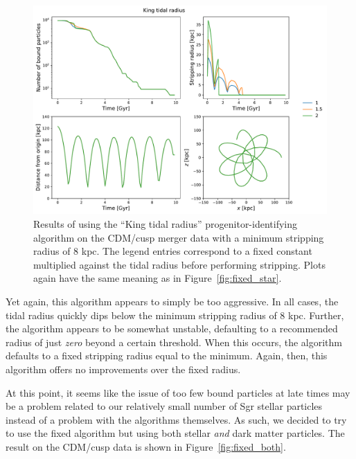 \begin{figure}
    \centering
    \includegraphics[width=0.9\linewidth]{figs/king_star.pdf}
    \caption{%
        Results of using the ``King tidal radius'' progenitor-identifying
        algorithm on the CDM/cusp merger data with a minimum stripping radius of
        8 kpc. The legend entries correspond to a fixed constant multiplied
        against the tidal radius before performing stripping. Plots again have
        the same meaning as in Figure~\ref{fig:fixed_star}.
    }
    \label{fig:king_star}
\end{figure}

Yet again, this algorithm appears to simply be too aggressive. In all cases, the
tidal radius quickly dips below the minimum stripping radius of 8 kpc. Further,
the algorithm appears to be somewhat unstable, defaulting to a recommended
radius of just \textit{zero} beyond a certain threshold. When this occurs, the
algorithm defaults to a fixed stripping radius equal to the minimum. Again,
then, this algorithm offers no improvements over the fixed radius.

At this point, it seems like the issue of too few bound particles at late times
may be a problem related to our relatively small number of Sgr stellar particles
instead of a problem with the algorithms themselves.  As such, we decided to
try to use the fixed algorithm but using both stellar \textit{and} dark matter
particles.  The result on the CDM/cusp data is shown in
Figure~\ref{fig:fixed_both}.

